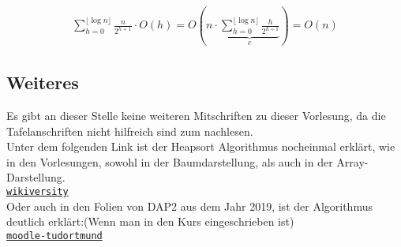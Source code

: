 \begin{align*}
    \sum_{h = 0}^{\lfloor \log n \rfloor} \frac{n}{2^{h+1}} \cdot O(h) = O(n \cdot \underbrace{\sum_{h = 0}^{\lfloor \log n \rfloor} \frac{h}{2^{h+1}}}_{c}) = O(n)
\end{align*}



\subsection{Weiteres}
Es gibt an dieser Stelle keine weiteren Mitschriften zu dieser Vorlesung, da die Tafelanschriften nicht hilfreich sind zum nachlesen.\\

Unter dem folgenden Link ist der Heapsort Algorithmus nocheinmal erklärt, wie in den Vorlesungen, sowohl in der Baumdarstellung, als auch in der Array-Darstellung.\\
\href{https://de.wikiversity.org/wiki/Kurs:Algorithmen_und_Datenstrukturen/Vorlesung/Heap_Sort_Vorgehensweise}{\nolinkurl{wikiversity}}
\\
Oder auch in den Folien von DAP2 aus dem Jahr 2019, ist der Algorithmus deutlich erklärt:(Wenn man in den Kurs eingeschrieben ist)\\
\href{https://moodle.tu-dortmund.de/pluginfile.php/895824/mod_resource/content/0/Vorlesung13-Datenstrukturen-III.pdf}{\nolinkurl{moodle-tudortmund}}
